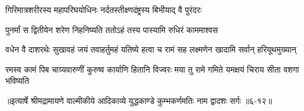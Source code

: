 \twolineshloka
{गिरिमात्रशरीरस्य महापरिघयोधिनः}
{नर्दतस्तीक्ष्णदंष्ट्रस्य बिभीयाद् वै पुरंदरः} %

\twolineshloka
{पुनर्मां स द्वितीयेन शरेण निहनिष्यति}
{ततोऽहं तस्य पास्यामि रुधिरं काममाश्वस} %

\twolineshloka
{वधेन वै दाशरथेः सुखावहं जयं तवाहर्तुमहं यतिष्ये}
{हत्वा च रामं सह लक्ष्मणेन खादामि सर्वान् हरियूथमुख्यान्} %

\twolineshloka
{रमस्व कामं पिब चाग्र्यवारुणीं कुरुष्व कार्याणि हितानि विज्वरः}
{मया तु रामे गमिते यमक्षयं चिराय सीता वशगा भविष्यति} %


॥इत्यार्षे श्रीमद्रामायणे वाल्मीकीये आदिकाव्ये युद्धकाण्डे कुम्भकर्णमतिः नाम द्वादशः सर्गः ॥६-१२॥
